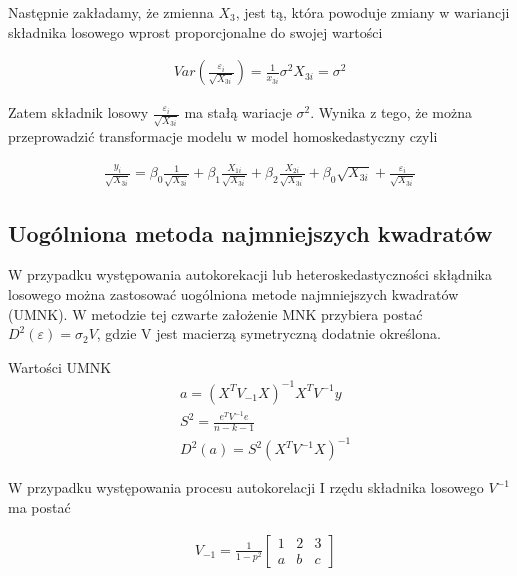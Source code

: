 Następnie zakładamy, że zmienna \( X_{3}\), jest tą, która powoduje zmiany w wariancji składnika losowego wprost proporcjonalne do swojej wartości

\begin{equation}
    \begin{split}
        Var(\frac{\varepsilon_{i}}{\sqrt{X_{3i}}}) = \frac{1}{x_{3i}}\sigma^{2}X_{3i}=\sigma^2
    \end{split}
\end{equation}

Zatem składnik losowy \( \frac{\varepsilon_{i}}{\sqrt{X_{3i}}}\) ma stałą wariacje \(\sigma^{2}\).
Wynika z tego, że można przeprowadzić transformacje modelu w model homoskedastyczny czyli

\begin{equation}
    \begin{split}
        \frac{y_{i}}{\sqrt{X_{3i}}} = \beta_{0}\frac{1}{\sqrt{X_{3i}}} + \beta_{1}\frac{X_{1i}}{\sqrt{X_{3i}}} + \beta_{2}\frac{X_{2i}}{\sqrt{X_{3i}}} + \beta_{0}\sqrt{X_{3i}}+\frac{\varepsilon_{i}}{\sqrt{X_{3i}}}
    \end{split}
\end{equation}

\subsection{Uogólniona metoda najmniejszych kwadratów}\label{subsec:uogólniona-metoda-najmniejszych-kwadratów}

W przypadku występowania autokorekacji lub heteroskedastyczności skłądnika losowego można zastosować uogólniona metode najmniejszych kwadratów (UMNK).
W metodzie tej czwarte założenie MNK przybiera postać \(D^{2}(\varepsilon) = \sigma_{2}V \), gdzie V jest macierzą symetryczną dodatnie określona.

Wartości UMNK
\begin{equation}
    \begin{split}
        &a = (X^{T}V_{-1}X)^{-1} X^{T}V^{-1}y \\
        &S^{2} = \frac{e^{T}V^{-1}e}{n-k-1} \\
        &D^2(a) = S^2(X^{T}V^{-1}X)^{-1}
    \end{split}
\end{equation}

W przypadku występowania procesu autokorelacji I rzędu składnika losowego \(V^{-1}\) ma postać

\begin{equation}
    \begin{split}
        &V_{-1} = \frac{1}{1-p^{2}} \begin{bmatrix}
                                        1 & 2 & 3\\
                                        a & b & c
        \end{bmatrix}
    \end{split}
\end{equation}


